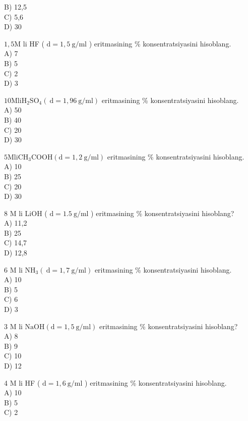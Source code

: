 B) 12,5\\
C) 5,6\\
D) 30
  \item $1,5 \mathrm{M}$ li HF ( $\mathrm{d}=1,5 \mathrm{~g} / \mathrm{ml}$ ) eritmasining \% konsentratsiyasini hisoblang.\\
A) 7\\
B) 5\\
C) 2\\
D) 3
  \item $10 \mathrm{M} \mathrm{li} \mathrm{H}_{2} \mathrm{SO}_{4}(\mathrm{~d}=1,96 \mathrm{~g} / \mathrm{ml})$ eritmasining \% konsentratsiyasini hisoblang.\\
A) 50\\
B) 40\\
C) 20\\
D) 30
  \item $5 \mathrm{M} \mathrm{li} \mathrm{CH}_{3} \mathrm{COOH}(\mathrm{d}=1,2 \mathrm{~g} / \mathrm{ml})$ eritmasining \% konsentratsiyasini hisoblang.\\
A) 10\\
B) 25\\
C) 20\\
D) 30
  \item 8 M li LiOH ( $\mathrm{d}=1.5 \mathrm{~g} / \mathrm{ml}$ ) eritmasining \% konsentratsiyasini hisoblang?\\
A) 11,2\\
B) 25\\
C) 14,7\\
D) 12,8
  \item 6 M li $\mathrm{NH}_{3}(\mathrm{~d}=1,7 \mathrm{~g} / \mathrm{ml})$ eritmasining \% konsentratsiyasini hisoblang.\\
A) 10\\
B) 5\\
C) 6\\
D) 3
  \item 3 M li $\mathrm{NaOH}(\mathrm{d}=1,5 \mathrm{~g} / \mathrm{ml})$ eritmasining \% konsentratsiyasini hisoblang?\\
A) 8\\
B) 9\\
C) 10\\
D) 12
  \item 4 M li HF ( $\mathrm{d}=1,6 \mathrm{~g} / \mathrm{ml}$ ) eritmasining \% konsentratsiyasini hisoblang.\\
A) 10\\
B) 5\\
C) 2\\
